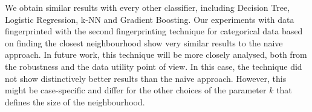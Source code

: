 We obtain similar results with every other classifier, including Decision Tree, Logistic Regression, k-NN and Gradient Boosting. 
Our experiments with data fingerprinted with the second fingerprinting technique for categorical data based on finding the closest neighbourhood show very similar results to the naive approach. In future work, this technique will be more closely analysed, both from the robustness and the data utility point of view. In this case, the technique did not show distinctively better results than the naive approach. However, this might be case-specific and differ for the other choices of the parameter $k$ that defines the size of the neighbourhood. 
